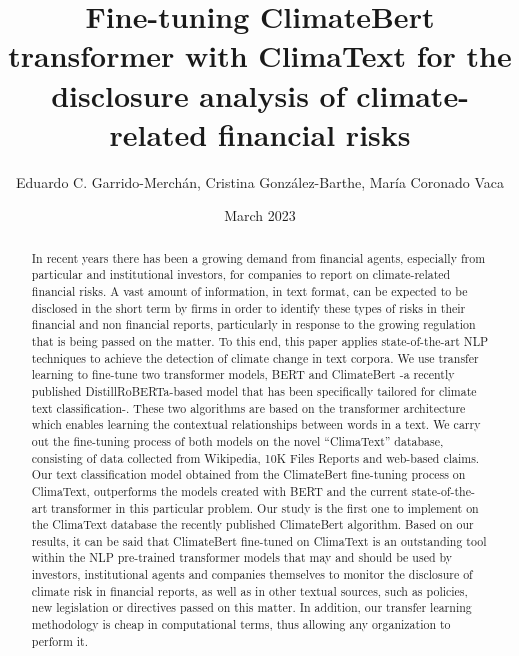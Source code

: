 \documentclass[runningheads]{llncs}
\begin{document}
\title{Fine-tuning ClimateBert transformer with ClimaText for the disclosure analysis of climate-related financial risks}
\author{Eduardo C. Garrido-Merchán, Cristina González-Barthe, María Coronado Vaca}
\date{March 2023}


\maketitle

\begin{abstract}
In recent years there has been a growing demand from financial agents, especially from particular and institutional investors, for companies to report on climate-related financial risks. A vast amount of information, in text format, can be expected to be disclosed in the short term by firms in order to identify these types of risks in their financial and non financial reports, particularly in response to the growing regulation that is being passed on the matter. To this end, this paper applies state-of-the-art NLP techniques to achieve the detection of climate change in text corpora. We use transfer learning to fine-tune two transformer models, BERT and ClimateBert -a recently published DistillRoBERTa-based model that has been specifically tailored for climate text classification-. These two  algorithms are based on the transformer architecture which enables learning the contextual relationships between words in a text. We carry out the fine-tuning process of both models on the novel “ClimaText” database, consisting of data collected from Wikipedia, 10K Files Reports and web-based claims.  Our text classification model obtained from the ClimateBert fine-tuning process on ClimaText, outperforms the models created with BERT and the current state-of-the-art transformer in this particular problem. Our study is the first one to implement on the ClimaText database the recently published ClimateBert algorithm. Based on our results, it can be said that ClimateBert fine-tuned on ClimaText is an outstanding tool within the NLP pre-trained transformer models that may and should be used by investors, institutional agents and companies themselves to monitor the disclosure of climate risk in financial reports, as well as in other textual sources, such as policies, new legislation or directives passed on this matter.  In addition, our transfer learning methodology is cheap in computational terms, thus allowing any organization to perform it.  
\end{abstract}
\end{document}
